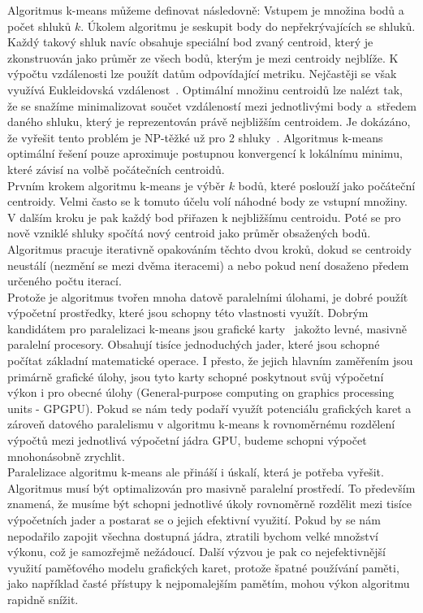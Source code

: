 Algoritmus k-means můžeme definovat následovně: Vstupem je množina bodů a počet shluků $k$. Úkolem algoritmu je seskupit body do nepřekrývajících se shluků. Každý takový shluk navíc obsahuje speciální bod zvaný centroid, který je zkonstruován jako průměr ze všech bodů, kterým je mezi centroidy nejblíže. K výpočtu vzdálenosti lze použít datům odpovídající metriku. Nejčastěji se však využívá Eukleidovská vzdálenost~\cite{Zechner09}. Optimální množinu centroidů lze nalézt tak, že se snažíme minimalizovat součet vzdáleností mezi jednotlivými body a~středem daného shluku, který je reprezentován právě nejbližším centroidem. Je dokázáno, že vyřešit tento problém je NP-těžké už pro 2 shluky~\cite{Drineas04}. Algoritmus k-means optimální řešení pouze aproximuje postupnou konvergencí k lokálnímu minimu, které závisí na volbě počátečních centroidů.\\

Prvním krokem algoritmu k-means je výběr $k$ bodů, které poslouží jako počáteční centroidy. Velmi často se k tomuto účelu volí náhodné body ze vstupní množiny. V dalším kroku je pak každý bod přiřazen k nejbližšímu centroidu. Poté se pro nově vzniklé shluky spočítá nový centroid jako průměr obsažených bodů. Algoritmus pracuje iterativně opakováním těchto dvou kroků, dokud se centroidy neustálí (nezmění se mezi dvěma iteracemi) a nebo pokud není dosaženo předem určeného počtu iterací.\\

Protože je algoritmus tvořen mnoha datově paralelními úlohami, je dobré použít výpočetní prostředky, které jsou schopny této vlastnosti využít.
Dobrým kandidátem pro paralelizaci k-means jsou grafické karty~\cite{Zechner09} jakožto levné, masivně paralelní procesory. Obsahují tisíce jednoduchých jader, které jsou schopné počítat základní matematické operace. I přesto, že jejich hlavním zaměřením jsou primárně grafické úlohy, jsou tyto karty schopné poskytnout svůj výpočetní výkon i pro obecné úlohy (General-purpose computing on graphics processing units - GPGPU). Pokud se nám tedy podaří využít potenciálu grafických karet a zároveň datového paralelismu v algoritmu k-means k rovnoměrnému rozdělení výpočtů mezi jednotlivá výpočetní jádra GPU, budeme schopni výpočet mnohonásobně zrychlit.\\


Paralelizace algoritmu k-means ale přináší i úskalí, která je potřeba vyřešit. Algoritmus musí být optimalizován pro masivně paralelní prostředí. To především znamená, že musíme být schopni jednotlivé úkoly rovnoměrně rozdělit mezi tisíce výpočetních jader a postarat se o jejich efektivní využití. Pokud by se nám nepodařilo zapojit všechna dostupná jádra, ztratili bychom velké množství výkonu, což je samozřejmě nežádoucí. Další výzvou je pak co nejefektivnější využití paměťového modelu grafických karet, protože špatné používání paměti, jako na\-pří\-klad časté přístupy k nejpomalejším pamětím, mohou výkon algoritmu rapidně snížit.\\

